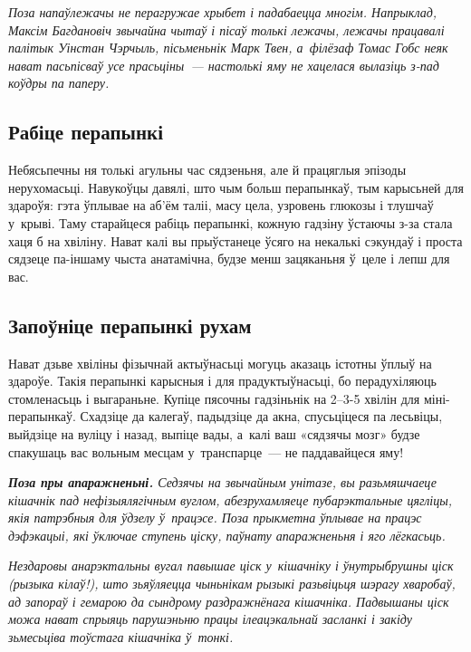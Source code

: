 \emph{Поза напаўлежачы не перагружае хрыбет і падабаецца многім. Напрыклад, Максім Багдановіч звычайна чытаў і пісаў толькі лежачы, лежачы працавалі палітык Уінстан Чэрчыль, пісьменьнік Марк Твен, а~філёзаф Томас Гобс неяк нават пасьпісваў усе прасьціны~--- настолькі яму не хацелася вылазіць з-пад коўдры па паперу.}


\subsection*{Рабіце перапынкі}

Небясьпечны ня толькі агульны час сядзеньня, але й працяглыя эпізоды нерухомасьці. Навукоўцы давялі, што чым больш перапынкаў, тым карысьней для здароўя: гэта ўплывае на аб'ём таліі, масу цела, узровень глюкозы і тлушчаў у~крыві. Таму старайцеся рабіць перапынкі, кожную гадзіну ўстаючы з-за стала хаця б на хвіліну. Нават калі вы прыўстанеце ўсяго на некалькі сэкундаў і проста сядзеце па-іншаму чыста анатамічна, будзе менш зацяканьня ў~целе і лепш для вас.

\subsection*{Запоўніце перапынкі рухам}

Нават дзьве хвіліны фізычнай актыўнасьці могуць аказаць істотны ўплыў на здароўе. Такія перапынкі карысныя і для прадуктыўнасьці, бо перадухіляюць стомленасьць і выгараньне. Купіце пясочны гадзіньнік на 2--3-5 хвілін для міні-перапынкаў. Схадзіце да калегаў, падыдзіце да акна, спусьціцеся па лесьвіцы, выйдзіце на вуліцу і назад, выпіце вады, а~калі ваш «сядзячы мозг» будзе спакушаць вас вольным месцам у~транспарце~--- не паддавайцеся яму!

\emph{\textbf{Поза пры апаражненьні.} Седзячы на звычайным унітазе, вы разьмяшчаеце кішачнік пад нефізыялягічным вуглом, абезрухамляеце пубарэктальные цягліцы, якія патрэбныя для ўдзелу ў~працэсе. Поза прыкметна ўплывае на працэс дэфэкацыі, які ўключае ступень ціску, паўнату апаражненьня і яго лёгкасьць.}

\emph{Нездаровы анарэктальны вугал павышае ціск у~кішачніку і ўнутрыбрушны ціск (рызыка кілаў!), што зьяўляецца чыньнікам рызыкі разьвіцьця шэрагу хваробаў, ад запораў і гемарою да сындрому раздражнёнага кішачніка. Падвышаны ціск можа нават спрыяць парушэньню працы ілеацэкальнай засланкі і закіду зьмесьціва тоўстага кішачніка ў~тонкі.}

